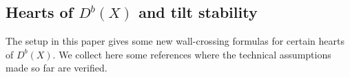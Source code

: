\documentclass[12pt]{amsart}
\theoremstyle{definition}
\newtheorem{definition}{Definition}[section]
\newtheorem{lemma}[definition]{Lemma}
\newcommand{\1}{\mathbf 1}
\newcommand{\FM}{{\mathfrak{M}}}
\newcommand{\mcomment}[1]{{\color{blue}M: #1}}
\newcommand{\vcomment}[1]{{\color{red}V: #1}}
\begin{document}










\subsection{Hearts of $D^b(X)$ and tilt stability}\label{subsec: tild}
The setup in this paper gives some new wall-crossing formulas for certain hearts of $D^b(X)$. We collect here some references where the technical assumptions made so far are verified. 
\end{document}
